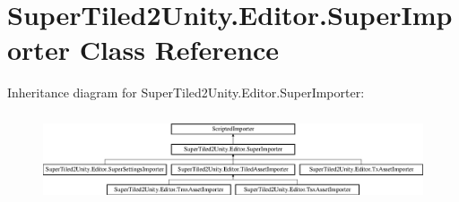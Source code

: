 \hypertarget{class_super_tiled2_unity_1_1_editor_1_1_super_importer}{}\section{Super\+Tiled2\+Unity.\+Editor.\+Super\+Importer Class Reference}
\label{class_super_tiled2_unity_1_1_editor_1_1_super_importer}
Inheritance diagram for Super\+Tiled2\+Unity.\+Editor.\+Super\+Importer\+:\begin{figure}[H]
\begin{center}
\leavevmode
\includegraphics[height=2.657177cm]{class_super_tiled2_unity_1_1_editor_1_1_super_importer}
\end{center}
\end{figure}
